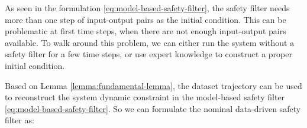 \begin{remark}\label{remark:usage-output-safety-filter}
    As seen in the formulation \cref{eq:model-based-safety-filter}, the safety filter needs more than one step of input-output pairs as the initial condition.
    This can be problematic at first time steps, when there are not enough input-output pairs available.
    To walk around this problem, we can either run the system without a safety filter for a few time steps, or use expert knowledge to construct a proper initial condition.
\end{remark}

Based on Lemma \ref{lemma:fundamental-lemma}, the dataset trajectory can be used to reconstruct the system dynamic constraint in the model-based safety filter \ref{eq:model-based-safety-filter}.
So we can formulate the nominal data-driven safety filter as:

